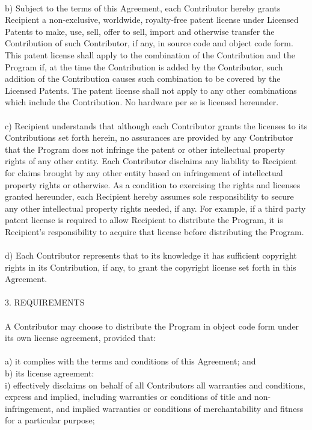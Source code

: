 \documentclass[a4paper, 12pt]{book}
\begin{document}
\\
b) Subject to the terms of this Agreement, each Contributor hereby grants Recipient a non-exclusive, worldwide, royalty-free patent license under Licensed Patents to make, use, sell, offer to sell, import and otherwise transfer the Contribution of such Contributor, if any, in source code and object code form. This patent license shall apply to the combination of the Contribution and the Program if, at the time the Contribution is added by the Contributor, such addition of the Contribution causes such combination to be covered by the Licensed Patents. The patent license shall not apply to any other combinations which include the Contribution. No hardware per se is licensed hereunder.\\
\\
c) Recipient understands that although each Contributor grants the licenses to its Contributions set forth herein, no assurances are provided by any Contributor that the Program does not infringe the patent or other intellectual property rights of any other entity. Each Contributor disclaims any liability to Recipient for claims brought by any other entity based on infringement of intellectual property rights or otherwise. As a condition to exercising the rights and licenses granted hereunder, each Recipient hereby assumes sole responsibility to secure any other intellectual property rights needed, if any. For example, if a third party patent license is required to allow Recipient to distribute the Program, it is Recipient's responsibility to acquire that license before distributing the Program.\\
\\
d) Each Contributor represents that to its knowledge it has sufficient copyright rights in its Contribution, if any, to grant the copyright license set forth in this Agreement.\\
\\
3. REQUIREMENTS\\
\\
A Contributor may choose to distribute the Program in object code form under its own license agreement, provided that:\\
\\
a) it complies with the terms and conditions of this Agreement; and\\
b) its license agreement:\\
i) effectively disclaims on behalf of all Contributors all warranties and conditions, express and implied, including warranties or conditions of title and non-infringement, and implied warranties or conditions of merchantability and fitness for a particular purpose;\\
\end{document}
